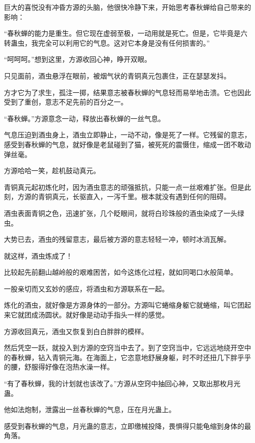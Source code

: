 
\begin{this_body}

巨大的喜悦没有冲昏方源的头脑，他很快冷静下来，开始思考春秋蝉给自己带来的影响：

“春秋蝉的能力是重生。但它现在虚弱至极，一动用就是死亡。但是，它毕竟是六转蛊虫，我完全可以利用它的气息。这对它本身是没有任何损害的。”

“呵呵呵。”想到这里，方源收回心神，睁开双眼。

只见面前，酒虫悬浮在眼前，被烟气状的青铜真元包裹住，正在瑟瑟发抖。

方才它为了求生，孤注一掷，结果意志被春秋蝉的气息轻而易举地击溃。它也因此受到了重创，意志不足先前的百分之一。

“春秋蝉。”方源意念一动，释放出春秋蝉的一丝气息。

气息压迫到酒虫身上，酒虫立即静止，一动不动，像是死了一样。它残留的意志，感受到春秋蝉的气息，就好像是老鼠碰到了猫，被死死的震慑住，缩成一团不敢动弹丝毫。

方源哈哈一笑，趁机鼓动真元。

青铜真元起初炼化时，因为酒虫意志的顽强抵抗，只能一点一丝艰难扩张。但是此刻，方源的青铜真元，长驱直入，一泻千里。根本就没有遇到任何的阻碍。

酒虫表面青铜之色，迅速扩张，几个眨眼间，就将白珍珠般的酒虫染成了一头绿虫。

大势已去，酒虫的残留意志，最后被方源的意志轻轻一冲，顿时冰消瓦解。

就这样，酒虫炼成了！

比较起先前翻山越岭般的艰难困苦，如今这炼化过程，就如同喝口水般简单。

一股亲切而又玄妙的感应，将酒虫和方源联系在一起。

炼化的酒虫，就好像是方源身体的一部分。方源叫它蜷缩身躯它就蜷缩，叫它团起来它就团成汤圆状。就好像是动动手指头一样的感觉。

方源收回真元，酒虫又恢复到白白胖胖的模样。

然后凭空一跃，就投入到方源的空窍当中去了。到了空窍当中，它远远地绕开空中的春秋蝉，钻入青铜元海。在海面上，它恣意地舒展身躯，时不时还扭几下胖乎乎的腰，舒服得好像在泡热水澡一样。

“有了春秋蝉，我的计划就也该改了。”方源从空窍中抽回心神，又取出那枚月光蛊。

他如法炮制，泄露出一丝春秋蝉的气息，压在月光蛊上。

感受到春秋蝉的气息，月光蛊的意志，立即缴械投降，畏惧得只能龟缩到身体的最角落。


\end{this_body}
